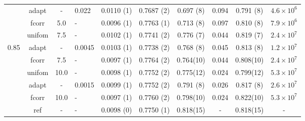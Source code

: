 \documentclass[aps,pre,preprint]{revtex4}
\begin{document}
\begin{table}
\begin{tabular*}{0.99\textwidth}{c|c|@{\extracolsep{\fill}}clcccccc}
    & \textrm{adapt}  & -       & 0.022   & 0.0110 (1) & 0.7687 (2) & 0.697 (8) & 0.094 & 0.791 (8) & $4.6\times 10^6$\\
    & \textrm{fcorr}  & 5.0     & -       & 0.0096 (1) & 0.7763 (1) & 0.713 (8) & 0.097 & 0.810 (8) & $7.9\times 10^6$\\\cline{2-10}
    & \textrm{unifom} & 7.5     & -       & 0.0102 (1) & 0.7741 (2) & 0.776 (7) & 0.044 & 0.819 (7) & $2.4\times 10^7$\\
0.85& \textrm{adapt}  & -       & 0.0045  & 0.0103 (1) & 0.7738 (2) & 0.768 (8) & 0.045 & 0.813 (8) & $1.2\times 10^7$\\
    & \textrm{fcorr}  & 7.5     & -       & 0.0097 (1) & 0.7764 (2) & 0.764(10) & 0.044 & 0.808(10) & $2.4\times 10^7$\\\cline{2-10}
    & \textrm{unifom} & 10.0    & -       & 0.0098 (1) & 0.7752 (2) & 0.775(12) & 0.024 & 0.799(12) & $5.3\times 10^7$\\
    & \textrm{adapt}  & -       & 0.0015  & 0.0099 (1) & 0.7752 (2) & 0.791 (8) & 0.026 & 0.817 (8) & $2.6\times 10^7$\\
    & \textrm{fcorr}  & 10.0    & -       & 0.0097 (1) & 0.7760 (2) & 0.798(10) & 0.024 & 0.822(10) & $5.3\times 10^7$\\\cline{2-10}
    & \textrm{ref}    & -       & -       & 0.0098 (0) & 0.7750 (1) & 0.818(15) & -     & 0.818(15) & - \\    \hline\hline
  \end{tabular*}
\end{table}
\end{document}
